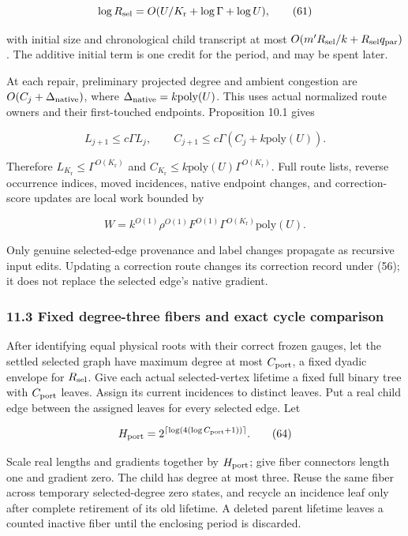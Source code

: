 \[
\log R_{\rm sel}=O(U/K_{\mathrm r}+\log\Gamma+\log U),
 \tag{61}
\]

with initial size and chronological child transcript at most \(O(m'R_{\rm sel}/k+R_{\rm sel}q_{\rm par})\). The additive initial term is one credit for the period, and may be spent later.

At each repair, preliminary projected degree and ambient congestion are \(O(C_j+\Delta_{\rm native})\), where \(\Delta_{\rm native}=k\mathrm{poly}(U)\). This uses actual normalized route owners and their first-touched endpoints. Proposition 10.1 gives

\[
L_{j+1}\leq c\Gamma L_j,\qquad
 C_{j+1}\leq c\Gamma(C_j+k\mathrm{poly}(U)).
 \tag{62}
\]

Therefore \(L_{K_{\mathrm r}}\leq\Gamma^{O(K_{\mathrm r})}\) and \(C_{K_{\mathrm r}}\leq k\mathrm{poly}(U)\Gamma^{O(K_{\mathrm r})}\). Full route lists, reverse occurrence indices, moved incidences, native endpoint changes, and correction-score updates are local work bounded by

\[
W=k^{O(1)}\rho^{O(1)}F^{O(1)}
                       \Gamma^{O(K_{\mathrm r})}\mathrm{poly}(U).
 \tag{63}
\]

Only genuine selected-edge provenance and label changes propagate as recursive input edits. Updating a correction route changes its correction record under (56); it does not replace the selected edge's native gradient.

\hypertarget{af-46593eb93e-fixed-degree-three-fibers-and-exact-cycle-comparison}{%
\subsubsection{11.3 Fixed degree-three fibers and exact cycle comparison}\label{af-46593eb93e-fixed-degree-three-fibers-and-exact-cycle-comparison}}

After identifying equal physical roots with their correct frozen gauges, let the settled selected graph have maximum degree at most \(C_{\rm port}\), a fixed dyadic envelope for \(R_{\rm sel}\). Give each actual selected-vertex lifetime a fixed full binary tree with \(C_{\rm port}\) leaves. Assign its current incidences to distinct leaves. Put a real child edge between the assigned leaves for every selected edge. Let

\[
H_{\rm port}=
 2^{\lceil\log(4(\log C_{\rm port}+1))\rceil}.
 \tag{64}
\]

Scale real lengths and gradients together by \(H_{\rm port}\); give fiber connectors length one and gradient zero. The child has degree at most three. Reuse the same fiber across temporary selected-degree zero states, and recycle an incidence leaf only after complete retirement of its old lifetime. A deleted parent lifetime leaves a counted inactive fiber until the enclosing period is discarded.

